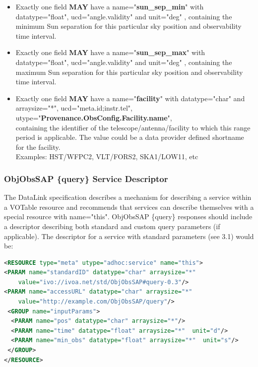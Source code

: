 \documentclass[11pt,a4paper]{ivoatex/ivoa}
\begin{document}
\begin{itemize}
\item {Exactly one field \textbf{MAY }have a name="\textbf{sun\_sep\_min}" with\\
datatype="float", ucd="angle.validity" and
unit="deg" , containing the minimum Sun separation for this particular
sky position and observability time interval.}

\item {Exactly one field \textbf{MAY }have a name="\textbf{sun\_sep\_max}" with\\
datatype="float", ucd="angle.validity" and
unit="deg" , containing the maximum Sun separation for this particular
sky position and observability time interval.}

\item {Exactly one field \textbf{MAY} have a name="\textbf{facility}" 
with datatype="char" and arraysize="*", ucd="meta.id;instr.tel",\\
utype="\textbf{Provenance.ObsConfig.Facility.name}",\\ 
containing the identifier of the telescope/antenna/facility to which
this range period is applicable. The value could be a data provider
defined shortname for the facility. \\
Examples: HST/WFPC2, VLT/FORS2, SKA1/LOW11, etc}
\end{itemize}

\subsubsection{ObjObsSAP \{query\} Service Descriptor}
The DataLink specification describes a mechanism for describing a
service within a VOTable resource and recommends that services can
describe themselves with a special resource with name="this". ObjObsSAP
\{query\} responses should include a descriptor describing both standard
and custom query parameters (if applicable). The descriptor for a
service with standard parameters (see 3.1) would be:\\

\begin{lstlisting}[language=XML]
<RESOURCE type="meta" utype="adhoc:service" name="this">
<PARAM name="standardID" datatype="char" arraysize="*"
    value="ivo://ivoa.net/std/ObjObsSAP#query-0.3"/>
<PARAM name="accessURL" datatype="char" arraysize="*"
    value="http://example.com/ObjObsSAP/query"/>
 <GROUP name="inputParams">
  <PARAM name="pos" datatype="char" arraysize="*"/>
  <PARAM name="time" datatype="float" arraysize="*"	 unit="d"/>
  <PARAM name="min_obs" datatype="float" arraysize="*"	unit="s"/>
 </GROUP>
</RESOURCE>
\end{lstlisting}
\end{document}
